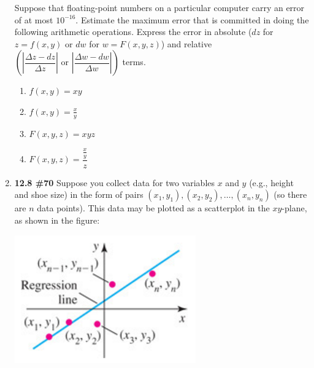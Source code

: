 \documentclass[%
]{article}
\begin{document}
\begin{enumerate}
Suppose that floating-point numbers on a particular computer carry an error of at most $10^{-16}$.  Estimate the maximum error that is committed in doing the following arithmetic operations.  Express the error in absolute ($dz$ for $z=f(x,y)$ or $dw$ for $w=F(x,y,z)$) and relative $\left(\left|\dfrac{\Delta z-dz}{\Delta z}\right|\text{ or }\left|\dfrac{\Delta w-dw}{\Delta w}\right|\right)$ terms.
\begin{enumerate}
	\item $f(x,y)=xy$
	\item $f(x,y)=\frac{x}{y}$
	\item $F(x,y,z)=xyz$
	\item $F(x,y,z)=\dfrac{\frac{x}{y}}{z}$
\end{enumerate}


\vspace{1pc}
\item {\bf 12.8 \#70}
Suppose you collect data for two variables $x$ and $y$ (e.g., height and shoe size) in the form of pairs $(x_1,y_1),(x_2,y_2),\dots,(x_n,y_n)$ (so there are $n$ data points).  This data may be plotted as a scatterplot in the $xy$-plane, as shown in the figure:

\begin{center}
\includegraphics{Q3regression}
\end{center}


\end{enumerate}
\end{document}
